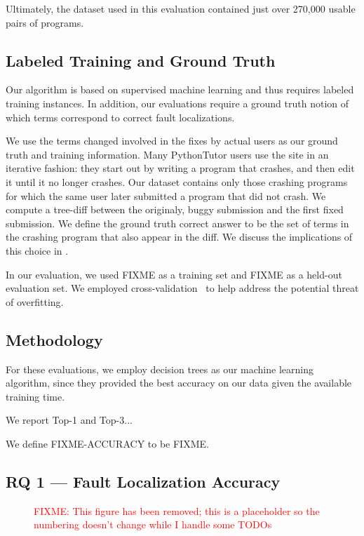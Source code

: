 \documentclass[conference]{IEEEtran}
\newcommand{\fixme}[1]{\textcolor{red}{FIXME: #1}}
\begin{document}
Ultimately, the dataset used in this evaluation contained just over
270,000 usable pairs of programs.

\subsection{Labeled Training and Ground Truth}

Our algorithm is based on supervised machine learning and thus requires
labeled training instances. In addition, our evaluations require a ground
truth notion of which terms correspond to correct fault localizations.

We use the terms changed involved in the fixes by actual users as our
ground truth and training information.  Many PythonTutor users use the site
in an iterative fashion: they start out by writing a program that crashes,
and then edit it until it no longer crashes. Our dataset contains only
those crashing programs for which the same user later submitted a program
that did not crash. We compute a tree-diff \cite{tree-diff} between the
originaly, buggy submission and the first fixed submission. We define
the ground truth correct answer to be the set of terms in the crashing
program that also appear in the diff. We discuss the implications of this
choice in .

In our evaluation, we used FIXME as a training set and FIXME as a held-out
evaluation set. We employed cross-validation~\cite{kohavi} to help address
the potential threat of overfitting.

\subsection{Methodology}

For these evaluations, we employ decision trees as our machine learning
algorithm, since they provided the best accuracy on our data given the
available training time.

We report Top-1 and Top-3...

We define FIXME-ACCURACY to be FIXME.

\subsection{RQ 1 --- Fault Localization Accuracy}

\begin{figure}

\caption{\fixme{This figure has been removed; this is a placeholder so the
numbering doesn't change while I handle some TODOs}}
\label{fig-full-dataset-acc}
\end{figure}
\end{document}
